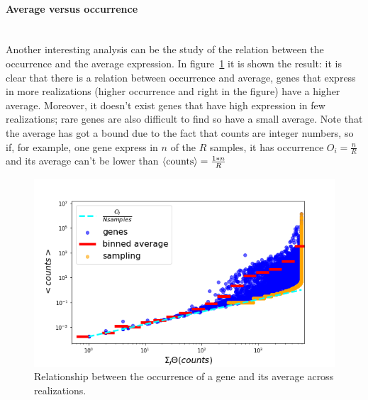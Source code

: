 \paragraph{Average versus occurrence}\mbox{}\\
Another interesting analysis can be the study of the relation between the occurrence and the average expression. In figure~\ref{fig:scalinglaws/gtex/meanDiff_binned_sampling} it is shown the result: it is clear that there is a relation between occurrence and average, genes that express in more realizations (higher occurrence and right in the figure) have a higher average. Moreover, it doesn't exist genes that have high expression in few realizations; rare genes are also difficult to find so have a small average. Note that the average has got a bound due to the fact that counts are integer numbers, so if, for example, one gene express in $n$ of the $R$ samples, it has occurrence $O_i=\frac{n}{R}$ and its average can't be lower than $\left\langle \mathrm{counts}\right\rangle=\frac{1*n}{R}$
\begin{figure}[htb!]
    \centering
    \includegraphics[width=0.9\linewidth]{pictures/scalinglaws/gtex/meanDiff_binned_sampling.png}
    \caption{Relationship between the occurrence of a gene and its average across realizations.}
    \label{fig:scalinglaws/gtex/meanDiff_binned_sampling}
\end{figure}
